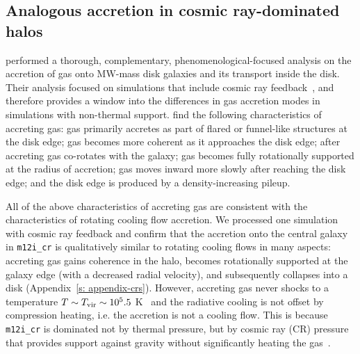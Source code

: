 \documentclass[fleqn,usenatbib]{mnras}
\begin{document}
\subsection{Analogous accretion in cosmic ray-dominated halos}
\label{s: crs}

\cite{Trapp2021} performed a thorough, complementary, phenomenological-focused analysis on the accretion of gas onto MW-mass disk galaxies and its transport inside the disk.
Their analysis focused on simulations that include cosmic ray feedback~\citep[][]{Chan2019, Hopkins2020a}, and therefore provides a window into the differences in gas accretion modes in simulations with non-thermal support.
\citeauthor{Trapp2021} find the following characteristics of accreting gas:
gas primarily accretes as part of flared or funnel-like structures at the disk edge;
gas becomes more coherent as it approaches the disk edge;
after accreting gas co-rotates with the galaxy;
gas becomes fully rotationally supported at the radius of accretion;
gas moves inward more slowly after reaching the disk edge;
and the disk edge is produced by a density-increasing pileup.

All of the above characteristics of accreting gas are consistent with the characteristics of rotating cooling flow accretion.
We processed one simulation with cosmic ray feedback and confirm that the accretion onto the central galaxy in \texttt{m12i\_cr} is qualitatively similar to rotating cooling flows in many aspects:
accreting gas gains coherence in the halo, becomes rotationally supported at the galaxy edge (with a decreased radial velocity), and subsequently collapses into a disk (Appendix~\ref{s: appendix-crs}).
However, accreting gas never shocks to a temperature $T \sim T_{\rm vir} \sim 10^5.5$ K~\citep{Ji2021} and the radiative cooling is not offset by compression heating, i.e. the accretion is not a cooling flow.
This is because \texttt{m12i\_cr} is dominated not by thermal pressure, but by cosmic ray (CR) pressure that provides support against gravity without significantly heating the gas~\citep{Ji2020}.
\end{document}
